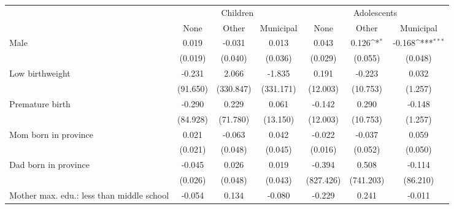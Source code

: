 {
\def\sym#1{\ifmmode^{#1}\else\(^{#1}\)\fi}
\begin{tabular}{l*{6}{c}}
\toprule
& \multicolumn{3}{c}{Children} & \multicolumn{3}{c}{Adolescents} \\
                    &\multicolumn{1}{c}{None}&\multicolumn{1}{c}{Other}&\multicolumn{1}{c}{Municipal}&\multicolumn{1}{c}{None}&\multicolumn{1}{c}{Other}&\multicolumn{1}{c}{Municipal}\\
\midrule
Male                &       0.019         &      -0.031         &       0.013         &       0.043         &       0.126\sym{*}  &      -0.168\sym{***}\\
                    &     (0.019)         &     (0.040)         &     (0.036)         &     (0.029)         &     (0.055)         &     (0.048)         \\
\addlinespace
Low birthweight     &      -0.231         &       2.066         &      -1.835         &       0.191         &      -0.223         &       0.032         \\
                    &    (91.650)         &   (330.847)         &   (331.171)         &    (12.003)         &    (10.753)         &     (1.257)         \\
\addlinespace
Premature birth     &      -0.290         &       0.229         &       0.061         &      -0.142         &       0.290         &      -0.148         \\
                    &    (84.928)         &    (71.780)         &    (13.150)         &    (12.003)         &    (10.753)         &     (1.257)         \\
\addlinespace
Mom born in province&       0.021         &      -0.063         &       0.042         &      -0.022         &      -0.037         &       0.059         \\
                    &     (0.021)         &     (0.048)         &     (0.045)         &     (0.016)         &     (0.052)         &     (0.050)         \\
\addlinespace
Dad born in province&      -0.045         &       0.026         &       0.019         &      -0.394         &       0.508         &      -0.114         \\
                    &     (0.026)         &     (0.048)         &     (0.043)         &   (827.426)         &   (741.203)         &    (86.210)         \\
\addlinespace
Mother max. edu.: less than middle school&      -0.054         &       0.134         &      -0.080         &      -0.229         &       0.241         &      -0.011         \\

\end{tabular}}
